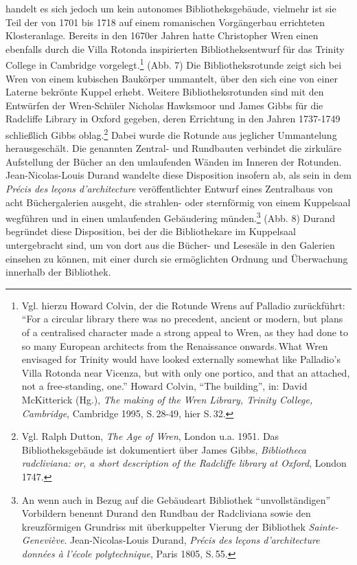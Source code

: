 handelt es sich jedoch um kein autonomes Bibliotheksgebäude, vielmehr
ist sie Teil der von 1701 bis 1718 auf einem romanischen Vorgängerbau
errichteten Klosteranlage. Bereits in den 1670er Jahren hatte
Christopher Wren einen ebenfalls durch die Villa Rotonda inspirierten
Bibliotheksentwurf für das Trinity College in Cambridge
vorgelegt.\footnote{Vgl. hierzu Howard Colvin, der die Rotunde Wrens auf
  Palladio zurückführt: \enquote{For a circular library there was no
  precedent, ancient or modern, but plans of a centralised character
  made a strong appeal to Wren, as they had done to so many European
  architects from the Renaissance onwards.\,What Wren envisaged for
  Trinity would have looked externally somewhat like Palladio's Villa
  Rotonda near Vicenza, but with only one portico, and that an attached,
  not a free-standing, one.} Howard Colvin, \enquote{The building}, in:
  David McKitterick (Hg.), \emph{The making of the Wren Library, Trinity
  College, Cambridge}, Cambridge 1995, S.\,28-49, hier S.\,32.} (Abb. 7)
Die Bibliotheksrotunde zeigt sich bei Wren von einem kubischen Baukörper
ummantelt, über den sich eine von einer Laterne bekrönte Kuppel erhebt.
Weitere Bibliotheksrotunden sind mit den Entwürfen der Wren-Schüler
Nicholas Hawksmoor und James Gibbs für die Radcliffe Library in Oxford
gegeben, deren Errichtung in den Jahren 1737-1749 schließlich Gibbs
oblag.\footnote{Vgl. Ralph Dutton, \emph{The Age of Wren}, London u.a.
  1951. Das Bibliotheksgebäude ist dokumentiert über James Gibbs,
  \emph{Bibliotheca radcliviana: or, a short description of the
  Radcliffe library at Oxford}, London 1747.} Dabei wurde die Rotunde
aus jeglicher Ummantelung herausgeschält. Die genannten Zentral- und
Rundbauten verbindet die zirkuläre Aufstellung der Bücher an den
umlaufenden Wänden im Inneren der Rotunden. Jean-Nicolas-Louis Durand
wandelte diese Disposition insofern ab, als sein in dem \emph{Précis des
leçons d'architecture} veröffentlichter Entwurf eines Zentralbaus von
acht Büchergalerien ausgeht, die strahlen- oder sternförmig von einem
Kuppelsaal wegführen und in einen umlaufenden Gebäudering
münden.\footnote{An wenn auch in Bezug auf die Gebäudeart Bibliothek
  \enquote{unvollständigen} Vorbildern benennt Durand den Rundbau der
  Radcliviana sowie den kreuzförmigen Grundriss mit überkuppelter
  Vierung der Bibliothek \emph{Sainte-Geneviève}. Jean-Nicolas-Louis
  Durand, \emph{Précis des leçons d'architecture données à l'école
  polytechnique}, Paris 1805, S.\,55.} (Abb. 8) Durand begründet diese
Disposition, bei der die Bibliothekare im Kuppelsaal untergebracht sind,
um von dort aus die Bücher- und Lesesäle in den Galerien einsehen zu
können, mit einer durch sie ermöglichten Ordnung und Überwachung
innerhalb der Bibliothek.

